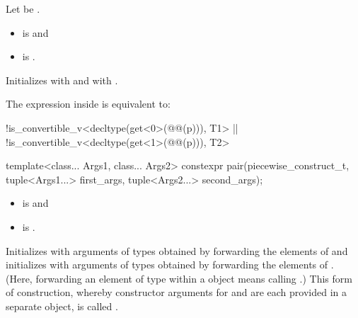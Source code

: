 \documentclass{wg21}
\begin{document}
\begin{itemdescr}
    \pnum
    Let  be .
    
    \pnum
    \constraints
    \begin{itemize}
        \item
        is  and
        \item
        is .
    \end{itemize}
    
    \pnum
    \effects
    Initializes  with  and
     with .
    
    \pnum
    \remarks
    The expression inside  is equivalent to:
    \begin{codeblock}
        !is_convertible_v<decltype(get<0>(@@(p))), T1> ||
        !is_convertible_v<decltype(get<1>(@@(p))), T2>
    \end{codeblock}
\end{itemdescr}

%
\begin{itemdecl}
    template<class... Args1, class... Args2>
    constexpr pair(piecewise_construct_t,
    tuple<Args1...> first_args, tuple<Args2...> second_args);
\end{itemdecl}

\begin{itemdescr}
    \pnum
    \mandates
    \begin{itemize}
        \item {} is  and
        \item {} is .
    \end{itemize}
    
    \pnum
    \effects
    Initializes  with arguments of types
     obtained by forwarding the elements of 
    and initializes  with arguments of types 
    obtained by forwarding the elements of . (Here, forwarding
    an element  of type  within a  object means calling
    .) This form of construction, whereby constructor
    arguments for  and  are each provided in a separate
     object, is called .
\end{itemdescr}
\end{document}
